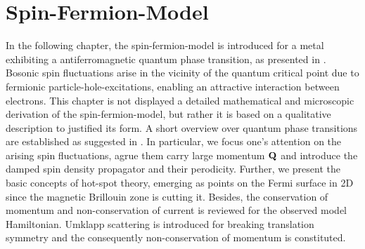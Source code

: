%
%
%
\chapter{Spin-Fermion-Model}
\label{ch:spin fermion model}
%
%
%
In the following chapter, the spin-fermion-model is introduced for a metal exhibiting a antiferromagnetic quantum phase transition, as presented in \cite{Abanov&Chubukov&Schmalian}.
Bosonic spin fluctuations arise in the vicinity of the quantum critical point due to fermionic particle-hole-excitations, enabling an attractive interaction between electrons.
This chapter is not displayed a detailed mathematical and microscopic derivation of the spin-fermion-model, but rather it is based on a qualitative description to justified its form.
A short overview over quantum phase transitions are established as suggested in \cite{SachdevQCP}.
In particular, we focus one's attention on the arising spin fluctuations, agrue them carry large momentum $\vb{Q}$ and introduce the damped spin density propagator and their perodicity.
Further, we present the basic concepts of hot-spot theory, emerging as points on the Fermi surface in 2D since the magnetic Brillouin zone is cutting it.
Besides, the conservation of momentum and non-conservation of current is reviewed for the observed model Hamiltonian.
Umklapp scattering is introduced for breaking translation symmetry and the consequently non-conservation of momentum is constituted.
%
%
